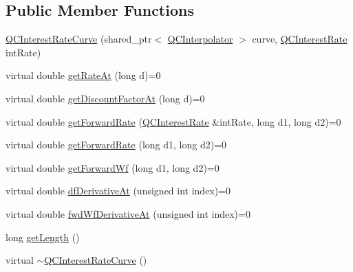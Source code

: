 \subsection*{Public Member Functions}
\begin{DoxyCompactItemize}
\item 
\hyperlink{class_q_c_interest_rate_curve_a9fbbecad2b5f69e7b873569e118fbbec}{Q\+C\+Interest\+Rate\+Curve} (shared\+\_\+ptr$<$ \hyperlink{class_q_c_interpolator}{Q\+C\+Interpolator} $>$ curve, \hyperlink{class_q_c_interest_rate}{Q\+C\+Interest\+Rate} int\+Rate)
\item 
virtual double \hyperlink{class_q_c_interest_rate_curve_a0a73e8506d0706becd93b04c4499a9c6}{get\+Rate\+At} (long d)=0
\item 
virtual double \hyperlink{class_q_c_interest_rate_curve_abe670a951f0fca2273726d13ce9cda06}{get\+Discount\+Factor\+At} (long d)=0
\item 
virtual double \hyperlink{class_q_c_interest_rate_curve_a66e79c4ed2e08916f14bbbfb5d1d3c96}{get\+Forward\+Rate} (\hyperlink{class_q_c_interest_rate}{Q\+C\+Interest\+Rate} \&int\+Rate, long d1, long d2)=0
\item 
virtual double \hyperlink{class_q_c_interest_rate_curve_af4c22b08db379ea8ce825f9999e2bc34}{get\+Forward\+Rate} (long d1, long d2)=0
\item 
virtual double \hyperlink{class_q_c_interest_rate_curve_a36c88024727170486082197f1abff78e}{get\+Forward\+Wf} (long d1, long d2)=0
\item 
virtual double \hyperlink{class_q_c_interest_rate_curve_a07a3e60dc1e7d25a025fc587b055c813}{df\+Derivative\+At} (unsigned int index)=0
\item 
virtual double \hyperlink{class_q_c_interest_rate_curve_a8aa3dcfb5a3ce169094db4e2f0849a94}{fwd\+Wf\+Derivative\+At} (unsigned int index)=0
\item 
long \hyperlink{class_q_c_interest_rate_curve_ad3c05d050bf861646fe49c1ac964a771}{get\+Length} ()
\item 
virtual \hyperlink{class_q_c_interest_rate_curve_a96a9bdf5a149ffe8acdabf3d136778e1}{$\sim$\+Q\+C\+Interest\+Rate\+Curve} ()
\end{DoxyCompactItemize}
